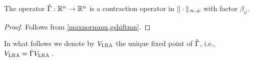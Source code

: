 \begin{comment}
\begin{theorem}\label{gmaxcontramn}
The operator $\Gamma  \colon \Re^n\ra \Re^n$ is a contraction operator in $\norm{\cdot}_{\mn}$ with factor $\beta_{\psi}$.
\end{theorem}
\end{comment}
\begin{theorem}\label{hgmaxcontramn}
The operator $\hat{\Gamma}:\mathbb{R}^n\to\mathbb{R}^n$  is a contraction operator in $\|\cdot\|_{\infty,\psi}$ with factor $\beta_{\psi}$.
\end{theorem}
\begin{proof}
Follows from \cref{maxnormmn,gshiftmn}.
\begin{comment}
We already know that $\hg$ is monotone. That $\hg$ satisfies~\cref{eq:shiftmn}
with $\beta = \beta_{\psi}$ follows similarly to the argument used in  \cref{tgshift}
with modifications similar to those introduced in the proof of \cref{gshiftmn}.
Then, \cref{gmaxcontramn} gives the desired result.
\end{comment}
\end{proof}
In what follows we denote by $V_{\text{\sc LRA}}$ the unique fixed point of $\hat{\Gamma}$, i.e., $V_{\text{\sc LRA}} = \hat{\Gamma} V_{\text{\sc LRA}}\,$. 

